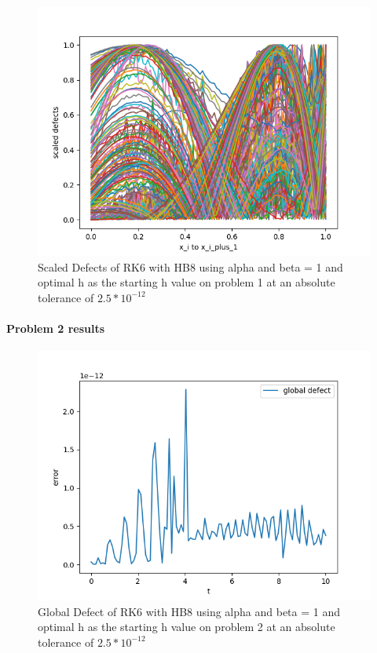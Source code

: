 \documentclass{article}
\begin{document}
\begin{figure}[H]
\centering
\includegraphics[width=0.7\linewidth]{./figures/sharp_tolerance_rk6_with_hb8_p1_scaled_defects}
\caption{Scaled Defects of RK6 with HB8 using alpha and beta = 1 and optimal h as the starting h value on problem 1 at an absolute tolerance of $2.5*10^{-12}$}
\label{fig:sharp_tolerance_rk6_with_hb8_p1_scaled_defects}
\end{figure}

\paragraph{Problem 2 results}
\begin{figure}[H]
\centering
\includegraphics[width=0.7\linewidth]{./figures/sharp_tolerance_rk6_with_hb8_p2_global_defect}
\caption{Global Defect of RK6 with HB8 using alpha and beta = 1 and optimal h as the starting h value on problem 2 at an absolute tolerance of $2.5*10^{-12}$}
\label{fig:sharp_tolerance_rk6_with_hb8_p2_global_defect}
\end{figure}
\end{document}
